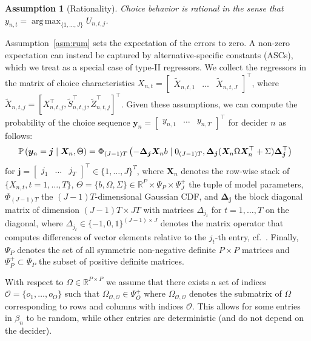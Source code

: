\documentclass[preprint,12pt,authoryear]{elsarticle}
\newtheorem{assumption}{Assumption}
\newcommand{\R}{\mathbb{R}}
\newcommand{\Oset}{{\mathcal O}}
\renewcommand{\Pr}{\mathbb{P}}
\DeclareMathOperator*{\argmax}{arg\,max}
\begin{document}
\begin{assumption}[Rationality]\label{asm:rationality}
Choice behavior is rational in the sense that $y_{n,t} = \argmax_{\{1,\dots,J\}} U_{n,t,j}$.
\end{assumption}

Assumption~\ref{asm:rum} sets the expectation of the errors to zero. A non-zero expectation can instead be captured by alternative-specific constants (ASCs), which we treat as a special case of type-II regressors. We collect the regressors in the matrix of choice characteristics $X_{n,t} = \begin{bmatrix} \tilde X_{n,t,1} & \dots & \tilde X_{n,t,J} \end{bmatrix}^\top$,
where $\tilde X_{n,t,j} = [X_{n,t,j}^\top,\tilde S_{n,t,j}^\top, \tilde Z_{n,t,j}^\top]^\top$. Given these assumptions, we can compute the probability of the choice sequence $\bm{y}_n = \begin{bmatrix}y_{n,1} & \dots & y_{n,T} \end{bmatrix}^\top$ for decider $n$ as follows:
%
\begin{align}
    \label{eq:prob}
    \hspace{-0.5em}\Pr \left( \bm{y}_n = \bm{j} \mid \bm{X}_n, \Theta \right) = \Phi_{(J-1)T}\left( - \bm{\Delta}_{\bm{j}} \bm{X}_n b \mid 0_{(J-1)T}, \bm{\Delta}_{\bm{j}} (\bm{X}_n \Omega \bm{X}_n^\top + \Sigma) \bm{\Delta}_{\bm{j}}^\top \right)
\end{align}
%
for $\bm{j} = \begin{bmatrix} j_1 & \dots & j_T \end{bmatrix}^\top \in \{1,\dots,J\}^T$, where $\bm{X}_n$ denotes the row-wise stack of $\{ X_{n,t}, t = 1,\dots, T\}$, $\Theta = \{ b, \Omega, \Sigma \} \in \R^P \times \Psi_P \times \Psi_J^+$ the tuple of model parameters, $\Phi_{(J-1)T}$ the $(J-1)T$-dimensional Gaussian CDF, and $\bm{\Delta}_{\bm{j}}$ the block diagonal matrix of dimension $(J-1)T\times JT$ with matrices $\Delta_{j_t}$ for $t = 1,\dots,T$ on the diagonal, where $\Delta_{j_t} \in \{ -1,0,1 \}^{(J-1) \times J}$ denotes the matrix operator that computes differences of vector elements relative to the $j_t$-th entry, cf.\ \citet[p.\ 99]{Train2009}.
Finally, $\Psi_P$ denotes the set of all symmetric non-negative definite $P \times P$ matrices and $\Psi_P^+ \subset \Psi_P$ the subset of positive definite matrices.

With respect to $\Omega \in \R^{P \times P}$ we assume that there exists
a set of indices $\Oset = \{ o_1,\dots,o_O \}$ such that $\Omega_{\Oset,\Oset} \in \Psi_O^+$ where $\Omega_{\Oset,\Oset}$ denotes the submatrix of $\Omega$
corresponding to rows and columns with indices $\Oset$. This allows for some
entries in $\beta_n$ to be random, while other entries are deterministic (and do not depend on the decider).
\end{document}
